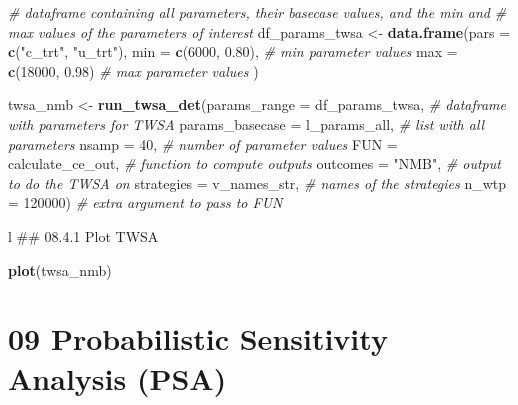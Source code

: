 \documentclass[
]{article}
\newenvironment{Shaded}{\begin{snugshade}}{\end{snugshade}}
\newcommand{\CommentTok}[1]{\textcolor[rgb]{0.56,0.35,0.01}{\textit{#1}}}
\newcommand{\DataTypeTok}[1]{\textcolor[rgb]{0.13,0.29,0.53}{#1}}
\newcommand{\DecValTok}[1]{\textcolor[rgb]{0.00,0.00,0.81}{#1}}
\newcommand{\FloatTok}[1]{\textcolor[rgb]{0.00,0.00,0.81}{#1}}
\newcommand{\KeywordTok}[1]{\textcolor[rgb]{0.13,0.29,0.53}{\textbf{#1}}}
\newcommand{\NormalTok}[1]{#1}
\newcommand{\StringTok}[1]{\textcolor[rgb]{0.31,0.60,0.02}{#1}}
\begin{document}
\begin{Shaded}
\begin{Highlighting}[]
\CommentTok{# dataframe containing all parameters, their basecase values, and the min and }
\CommentTok{# max values of the parameters of interest}
\NormalTok{df_params_twsa <-}\StringTok{ }\KeywordTok{data.frame}\NormalTok{(}\DataTypeTok{pars =} \KeywordTok{c}\NormalTok{(}\StringTok{"c_trt"}\NormalTok{, }\StringTok{"u_trt"}\NormalTok{),}
                             \DataTypeTok{min  =} \KeywordTok{c}\NormalTok{(}\DecValTok{6000}\NormalTok{, }\FloatTok{0.80}\NormalTok{),  }\CommentTok{# min parameter values}
                             \DataTypeTok{max  =} \KeywordTok{c}\NormalTok{(}\DecValTok{18000}\NormalTok{, }\FloatTok{0.98}\NormalTok{)  }\CommentTok{# max parameter values}
\NormalTok{                             )}

\NormalTok{twsa_nmb <-}\StringTok{ }\KeywordTok{run_twsa_det}\NormalTok{(}\DataTypeTok{params_range    =}\NormalTok{ df_params_twsa,    }\CommentTok{# dataframe with parameters for TWSA}
                         \DataTypeTok{params_basecase =}\NormalTok{ l_params_all,      }\CommentTok{# list with all parameters}
                         \DataTypeTok{nsamp           =} \DecValTok{40}\NormalTok{,                }\CommentTok{# number of parameter values}
                         \DataTypeTok{FUN             =}\NormalTok{ calculate_ce_out,  }\CommentTok{# function to compute outputs}
                         \DataTypeTok{outcomes        =} \StringTok{"NMB"}\NormalTok{,          }\CommentTok{# output to do the TWSA on}
                         \DataTypeTok{strategies      =}\NormalTok{ v_names_str,       }\CommentTok{# names of the strategies}
                         \DataTypeTok{n_wtp           =} \DecValTok{120000}\NormalTok{)            }\CommentTok{# extra argument to pass to FUN}
\end{Highlighting}
\end{Shaded}

l \#\# 08.4.1 Plot TWSA

\begin{Shaded}
\begin{Highlighting}[]
\KeywordTok{plot}\NormalTok{(twsa_nmb)}
\end{Highlighting}
\end{Shaded}

\hypertarget{probabilistic-sensitivity-analysis-psa}{%
\section{09 Probabilistic Sensitivity Analysis
(PSA)}\label{probabilistic-sensitivity-analysis-psa}}
\end{document}
